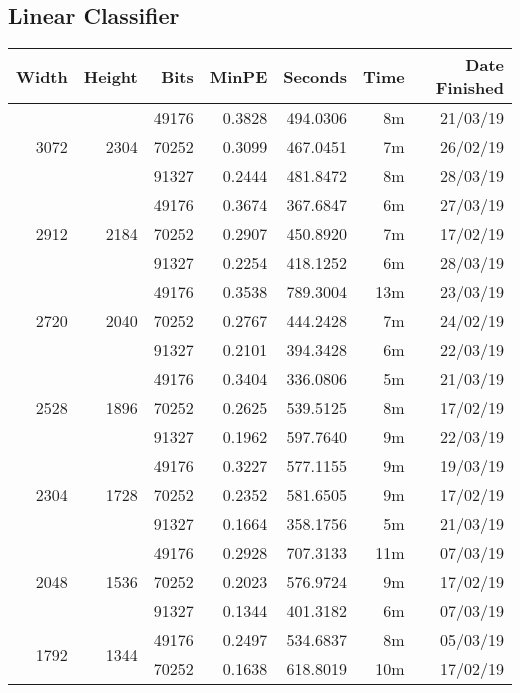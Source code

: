 \subsection{Linear Classifier}
  \begin{center}
  \begin{tabular}{ r r r | r | r r r }
  Width & Height & Bits & MinPE & Seconds & Time & Date Finished \\ \hline
  \multirow{3}{*}{3072} & \multirow{3}{*}{2304} & 49176 & 0.3828 & 494.0306 & 8m & 21/03/19 \\
  & & 70252 & 0.3099 & 467.0451 & 7m & 26/02/19 \\
  & & 91327 & 0.2444 & 481.8472 & 8m & 28/03/19 \\
  \hline
  \multirow{3}{*}{2912} & \multirow{3}{*}{2184} & 49176 & 0.3674 & 367.6847 & 6m & 27/03/19 \\
  & & 70252 & 0.2907 & 450.8920 & 7m & 17/02/19 \\
  & & 91327 & 0.2254 & 418.1252 & 6m & 28/03/19 \\
  \hline
  \multirow{3}{*}{2720} & \multirow{3}{*}{2040} & 49176 & 0.3538 & 789.3004 & 13m & 23/03/19 \\
  & & 70252 & 0.2767 & 444.2428 & 7m & 24/02/19 \\
  & & 91327 & 0.2101 & 394.3428 & 6m & 22/03/19 \\
  \hline
  \multirow{3}{*}{2528} & \multirow{3}{*}{1896} & 49176 & 0.3404 & 336.0806 & 5m & 21/03/19 \\
  & & 70252 & 0.2625 & 539.5125 & 8m & 17/02/19 \\
  & & 91327 & 0.1962 & 597.7640 & 9m & 22/03/19 \\
  \hline
  \multirow{3}{*}{2304} & \multirow{3}{*}{1728} & 49176 & 0.3227 & 577.1155 & 9m & 19/03/19 \\
  & & 70252 & 0.2352 & 581.6505 & 9m & 17/02/19 \\
  & & 91327 & 0.1664 & 358.1756 & 5m & 21/03/19 \\
  \hline
  \multirow{3}{*}{2048} & \multirow{3}{*}{1536} & 49176 & 0.2928 & 707.3133 & 11m & 07/03/19 \\
  & & 70252 & 0.2023 & 576.9724 & 9m & 17/02/19 \\
  & & 91327 & 0.1344 & 401.3182 & 6m & 07/03/19 \\
  \hline
  \multirow{3}{*}{1792} & \multirow{3}{*}{1344} & 49176 & 0.2497 & 534.6837 & 8m & 05/03/19 \\
  & & 70252 & 0.1638 & 618.8019 & 10m & 17/02/19 \\

\end{tabular}
\end{center}
